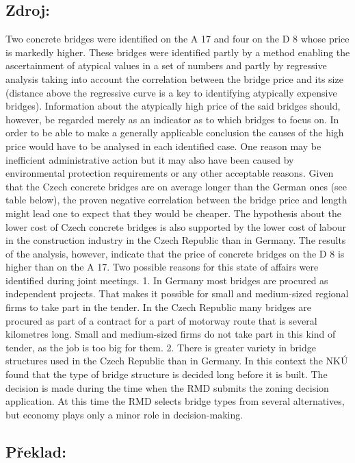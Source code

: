 \documentclass[10pt]{article}
\begin{document}
\subsection*{Zdroj:}

Two concrete bridges were identified on the A 17 and four on the D 8 whose price is markedly higher.
These bridges were identified partly by a method enabling the ascertainment of atypical values in a set of numbers and partly by regressive analysis taking into account the correlation between the bridge price and its size (distance above the regressive curve is a key to identifying atypically expensive bridges).
Information about the atypically high price of the said bridges should, however, be regarded merely as an indicator as to which bridges to focus on.
In order to be able to make a generally applicable conclusion the causes of the high price would have to be analysed in each identified case.
One reason may be inefficient administrative action but it may also have been caused by environmental protection requirements or any other acceptable reasons.
Given that the Czech concrete bridges are on average longer than the German ones (see table below), the proven negative correlation between the bridge price and length might lead one to expect that they would be cheaper.
The hypothesis about the lower cost of Czech concrete bridges is also supported by the lower cost of labour in the construction industry in the Czech Republic than in Germany.
The results of the analysis, however, indicate that the price of concrete bridges on the D 8 is higher than on the A 17.
Two possible reasons for this state of affairs were identified during joint meetings.
1.
In Germany most bridges are procured as independent projects.
That makes it possible for small and medium-sized regional firms to take part in the tender.
In the Czech Republic many bridges are procured as part of a contract for a part of motorway route that is several kilometres long.
Small and medium-sized firms do not take part in this kind of tender, as the job is too big for them.
2.
There is greater variety in bridge structures used in the Czech Republic than in Germany.
In this context the NKÚ found that the type of bridge structure is decided long before it is built.
The decision is made during the time when the RMD submits the zoning decision application.
At this time the RMD selects bridge types from several alternatives, but economy plays only a minor role in decision-making.


\pagebreak

\subsection*{Překlad:}
\end{document}
